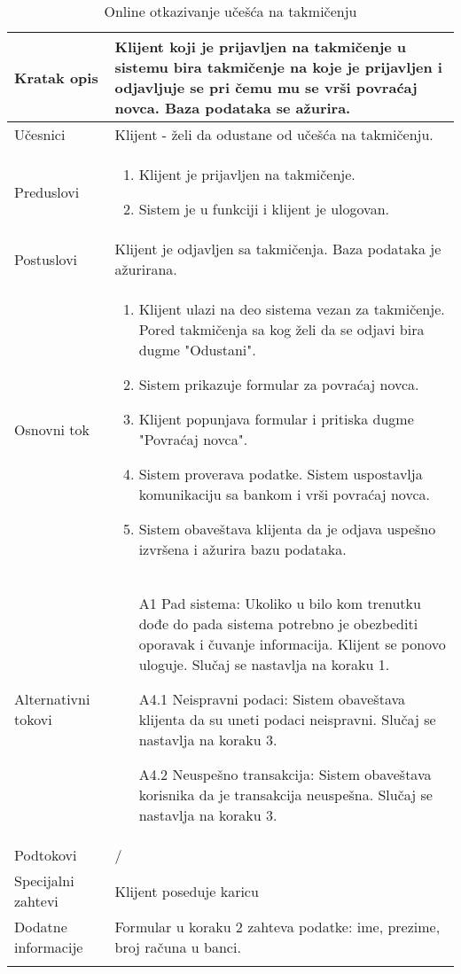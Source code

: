 \documentclass[../../main.tex]{subfiles}
\begin{document}
\begin{longtable}{| p{} | p{} |} 
\hline
    Kratak opis &  Klijent koji je prijavljen na takmičenje u sistemu bira takmičenje na koje je prijavljen i odjavljuje se pri čemu mu se vrši povraćaj novca. Baza podataka se ažurira.\\ 
\hline    
    Učesnici & Klijent - želi da odustane od učešća na takmičenju.\\
\hline
   Preduslovi & \begin{enumerate}
       \item Klijent je prijavljen na takmičenje.
       \item Sistem je u funkciji i klijent je ulogovan.
   \end{enumerate}\\
\hline  
    Postuslovi & Klijent je odjavljen sa takmičenja. Baza podataka je ažurirana.\\
\hline
    Osnovni tok & \begin{enumerate}
        \item Klijent ulazi na deo sistema vezan za takmičenje. Pored takmičenja sa kog želi da se odjavi bira dugme "Odustani".
        \item Sistem prikazuje formular za povraćaj novca.
        \item Klijent popunjava formular i pritiska dugme "Povraćaj novca".
        \item Sistem proverava podatke. Sistem uspostavlja komunikaciju sa bankom i vrši povraćaj novca. 
        \item Sistem obaveštava klijenta da je odjava uspešno izvršena i ažurira bazu podataka.
    \end{enumerate}\\
\hline
    Alternativni tokovi & \begin{itemize}
        \item[A1] Pad sistema: Ukoliko u bilo kom trenutku dođe do pada sistema potrebno je obezbediti oporavak i čuvanje informacija. Klijent se ponovo uloguje. Slučaj se nastavlja na koraku 1.
        \item[A4.1] Neispravni podaci: Sistem obaveštava klijenta da su uneti podaci neispravni. Slučaj se nastavlja na koraku 3.
        \item[A4.2] Neuspešno transakcija: Sistem obaveštava korisnika da je transakcija neuspešna. Slučaj se nastavlja na koraku 3.
    \end{itemize}\\
\hline
    Podtokovi & /\\
\hline
    Specijalni zahtevi & Klijent poseduje karicu\\
\hline
    Dodatne informacije & Formular u koraku 2 zahteva podatke: ime, prezime, broj računa u banci.\\
\hline
\caption{Online otkazivanje učešća na takmičenju} %
\end{longtable}
\end{document}
